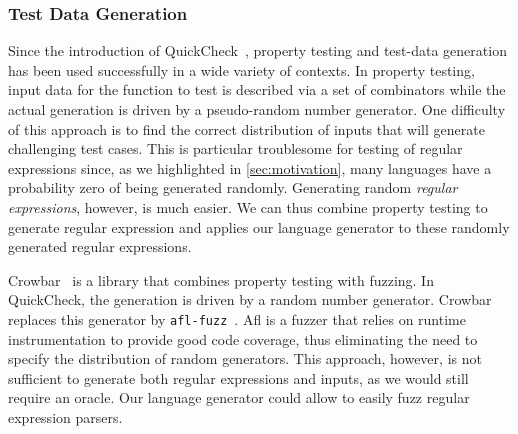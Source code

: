 \subsubsection*{Test Data Generation}

Since the introduction of QuickCheck~\cite{DBLP:conf/icfp/ClaessenH00},
property testing and test-data generation has been used successfully in a
wide variety of contexts.
In property testing, input data for the function
to test is described via a set of combinators while the actual generation
is driven by a pseudo-random number generator. One difficulty of this approach is
to find the correct distribution of inputs that will generate challenging
test cases. This is particular troublesome for testing of regular expressions
since, as we highlighted in \cref{sec:motivation}, many languages
have a probability zero of being generated randomly.
Generating random \emph{regular expressions}, however, is much easier. We can
thus combine property testing to generate regular expression and applies
our language generator to these randomly generated regular expressions.

Crowbar~\cite{crowbar} is a library that combines property testing with fuzzing.
In QuickCheck, the generation is driven by a random number generator. Crowbar replaces this generator by \texttt{afl-fuzz}~\cite{afl}. Afl is a fuzzer that
relies on runtime instrumentation to provide
good code coverage, thus eliminating the need to specify the distribution of random generators.
This approach, however, is not sufficient to generate both regular expressions
and inputs, as we would still require an oracle. Our language generator
could allow to easily fuzz regular expression parsers.





